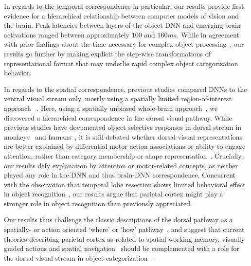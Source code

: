 \documentclass[10pt,twocolumn,letterpaper]{article}
\begin{document}
In regards to the temporal correspondence in particular, our results provide first evidence for a hierarchical relationship between computer models of vision and the brain. Peak latencies between layers of the object DNN and emerging brain activations ranged between approximately $100$ and $160ms$. While in agreement with prior findings about the time necessary for complex object processing~\cite{thorpe1996speed}, our results go further by making explicit the step-wise transformations of representational format that may underlie rapid complex object categorization behavior.

In regards to the spatial correspondence, previous studies compared DNNs to the ventral visual stream only, mostly using a spatially limited region-of-interest approach ~\cite{gucclu2014deep,khaligh2014deep,yamins2014performance}. Here, using a spatially unbiased whole-brain approach~\cite{kriegeskorte2006information}, we discovered a hierarchical correspondence in the dorsal visual pathway. While previous studies have documented object selective responses in dorsal stream in monkeys~\cite{janssen2008coding,sawamura2005using} and humans~\cite{chao2000representation,konen2008two}, it is still debated whether dorsal visual representations are better explained by differential motor action associations or ability to engage attention, rather than category membership or shape representation~\cite{grill1999differential,kourtzi2000cortical}. Crucially, our results defy explanation by attention or motor-related concepts, as neither played any role in the DNN and thus brain-DNN correspondence. Concurrent with the observation that temporal lobe resection shows limited behavioral effect in object recognition~\cite{buckley1997functional,weiskrantz1984impairments}, our results argue that parietal cortex might play a stronger role in object recognition than previously appreciated.

Our results thus challenge the classic descriptions of the dorsal pathway as a spatially- or action oriented `where' or `how' pathway~\cite{goodale1982analysis,milner1995visual}, and suggest that current theories describing parietal cortex as related to spatial working memory, visually guided actions and spatial navigation~\cite{kravitz2011new} should be complemented with a role for the dorsal visual stream in object categorization~\cite{konen2008two}.
\end{document}
